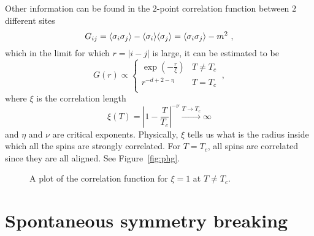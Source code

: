     Other information can be found in the $2$-point correlation function between $2$ different sites
    \begin{equation*}
        G_{ij} = \langle\sigma_i \sigma_j\rangle - \langle\sigma_i\rangle \langle\sigma_j\rangle =  \langle\sigma_i \sigma_j\rangle - m^2 ~,
    \end{equation*}
    which in the limit for which $r = |i - j|$ is large, it can be estimated to be 
    \begin{equation}\label{ph:eta}
        G(r) \propto \begin{cases}
            \exp(- \frac{r}{\xi}) & T \neq T_c \\
            r^{-d+2-\eta} & T = T_c \\
        \end{cases} ~,
    \end{equation}
    where $\xi$ is the correlation length 
    \begin{equation}\label{ph:nu}
        \xi(T) = |1 - \frac{T}{T_c}|^{-\nu} \xrightarrow{T \rightarrow T_c} \infty 
    \end{equation}
    and $\eta$ and $\nu$ are critical exponents. Physically, $\xi$ tells us what is the radius inside which all the spins are strongly correlated. For $ T = T_c$, all spins are correlated since they are all aligned. See Figure~\eqref{fig:phg}.

    \begin{figure}[h!]
        \centering
        \caption{A plot of the correlation function for $\xi = 1$ at $T \neq T_c$.}
        \label{fig:phg}
    \end{figure}

\section{Spontaneous symmetry breaking}

